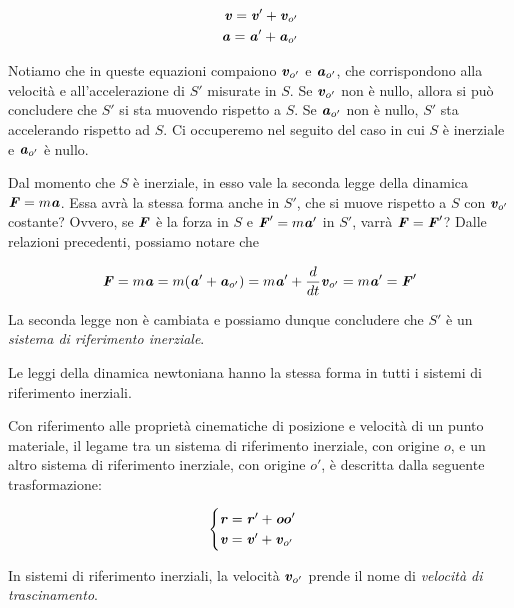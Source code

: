 \begin{align}
    \textbf{\textit{v}} = \textbf{\textit{v}}' + \textbf{\textit{v}}_{o'}\\
    \textbf{\textit{a}} = \textbf{\textit{a}}' + \textbf{\textit{a}}_{o'}
\end{align}

\noindent Notiamo che in queste equazioni compaiono $\textbf{\textit{v}}_{o'}$
e $\textbf{\textit{a}}_{o'}$, che corrispondono alla velocità e all'accelerazione
di $S'$ misurate in $S$. Se $\textbf{\textit{v}}_{o'}$ non è nullo, allora
si può concludere che $S'$ si sta muovendo rispetto a $S$. Se $\textbf{\textit{a}}_{o'}$
non è nullo, $S'$ sta accelerando rispetto ad $S$. Ci occuperemo nel seguito del
caso in cui $S$ è inerziale e $\textbf{\textit{a}}_{o'}$ è nullo.

Dal momento che $S$ è inerziale, in esso vale la seconda legge della
dinamica $\textbf{\textit{F}} = m\textbf{\textit{a}}$. Essa avrà la stessa forma anche
in $S'$, che si muove rispetto a $S$ con $\textbf{\textit{v}}_{o'}$ costante?
Ovvero, se $\textbf{\textit{F}}$ è la forza in $S$ e $\textbf{\textit{F}}' = m\textbf{\textit{a}}'$ in $S'$,
varrà $\textbf{\textit{F}} = \textbf{\textit{F}}'$?
Dalle relazioni precedenti, possiamo notare che

\[ \textbf{\textit{F}} = m\textbf{\textit{a}} = m(\textbf{\textit{a}}' + \textbf{\textit{a}}_{o'}) = m\textbf{\textit{a}}' + \frac{d}{dt}\textbf{\textit{v}}_{o'} = m\textbf{\textit{a}}' = \textbf{\textit{F}}' \]

\noindent La seconda legge non è cambiata e possiamo dunque concludere
che $S'$ è un \textit{sistema di riferimento inerziale}.

\begin{tcolorbox}[colback = yellow!30, colframe = yellow!30!black, title = {Principio dei relatività galileiana}]
Le leggi della dinamica newtoniana hanno la stessa forma in tutti i
sistemi di riferimento inerziali.

Con riferimento alle proprietà cinematiche di posizione e velocità di
un punto materiale, il legame tra un sistema di riferimento inerziale,
con origine $o$, e un altro sistema di riferimento inerziale, con
origine $o'$, è descritta dalla seguente trasformazione:

\begin{align}
\begin{cases}
    \textbf{\textit{r}} = \textbf{\textit{r}}' + \textbf{\textit{oo}}'\\
    \textbf{\textit{v}} = \textbf{\textit{v}}' + \textbf{\textit{v}}_{o'}
\end{cases}
\end{align}
\end{tcolorbox}

\noindent In sistemi di riferimento inerziali, la velocità $\textbf{\textit{v}}_{o'}$
prende il nome di \textit{velocità di trascinamento}.



